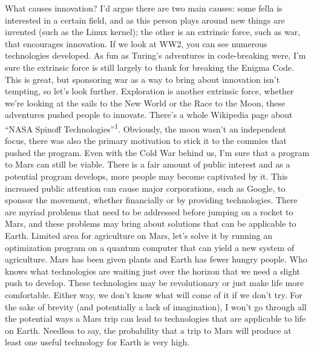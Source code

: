 \documentclass[main.tex]{subfiles}
\begin{document}
What causes innovation? I'd argue there are two main causes: some fella is interested in a certain field, and as this person plays around new things are invented (such as the Linux kernel); the other is an extrinsic force, such as war, that encourages innovation. If we look at WW2, you can see numerous technologies developed. As fun as Turing's adventures in code-breaking were, I'm sure the extrinsic force is still largely to thank for breaking the Enigma Code. This is great, but sponsoring war as a way to bring about innovation isn't tempting, so let's look further. Exploration is another extrinsic force, whether we're looking at the sails to the New World or the Race to the Moon, these adventures pushed people to innovate. There's a whole Wikipedia page about “NASA Spinoff Technologies”\textsuperscript{1}. Obviously, the moon wasn't an independent focus, there was also the primary motivation to stick it to the commies that pushed the program. Even with the Cold War behind us, I'm sure that a program to Mars can still be viable. There is a fair amount of public interest and as a potential program develops, more people may become captivated by it. This increased public attention can cause major corporations, such as Google, to sponsor the movement, whether financially or by providing technologies. There are myriad problems that need to be addressed before jumping on a rocket to Mars, and these problems may bring about solutions that can be applicable to Earth. Limited area for agriculture on Mars, let's solve it by running an optimization program on a quantum computer that can yield a new system of agriculture. Mars has been given plants and Earth has fewer hungry people. Who knows what technologies are waiting just over the horizon that we need a slight push to develop. These technologies may be revolutionary or just make life more comfortable. Either way, we don't know what will come of it if we don't try. For the sake of brevity (and potentially a lack of imagination), I won't go through all the potential ways a Mars trip can lead to technologies that are applicable to life on Earth. Needless to say, the probability that a trip to Mars will produce at least one useful technology for Earth is very high.
\end{document}
